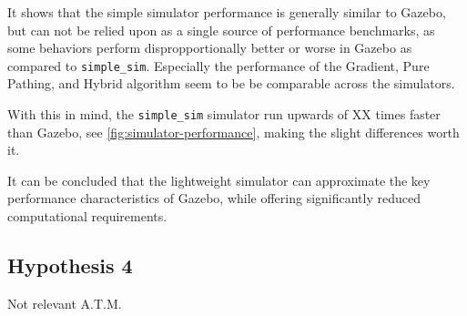 It shows that the simple simulator performance is generally similar to Gazebo, but can not be relied upon as a single source of performance benchmarks, as some behaviors perform dispropportionally better or worse in Gazebo as compared to \texttt{simple\_sim}. Especially the performance of the Gradient, Pure Pathing, and Hybrid algorithm seem to be be comparable across the simulators. 

With this in mind, the \texttt{simple\_sim} simulator run upwards of XX times faster than Gazebo, see \cref{fig:simulator-performance}, making the slight differences worth it.

It can be concluded that the lightweight simulator can approximate the key performance characteristics of Gazebo, while offering significantly reduced computational requirements. 

\subsection{Hypothesis 4}
Not relevant A.T.M.

